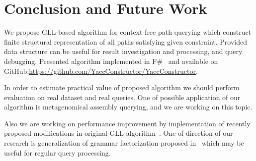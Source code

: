 \section{Conclusion and Future Work}

We propose GLL-based algorithm for context-free path querying which construct finite structural representation of all paths satisfying given constraint.
Provided data structure can be useful for result investigation and processing, and query debugging.
Presented algorithm implemented in F\#~\cite{FSharp} and available on GitHub:\url{https://github.com/YaccConstructor/YaccConstructor}.

In order to estimate practical value of proposed algorithm we should perform evaluation on real dataset and real queries.
One of possible application of our algorithm is metagenomical assembly querying, and we are working on this topic.

Also we are working on performance improvement by implementation of recently proposed modifications in original GLL algorithm~\cite{FGLL}.
One of direction of our research is generalization of grammar factorization proposed in~\cite{FGLL} which may be useful for regular query processing.


